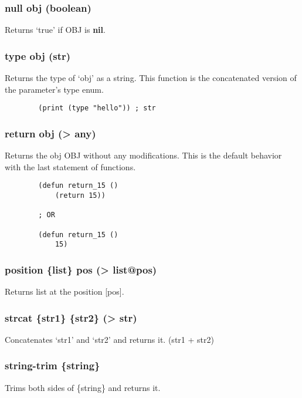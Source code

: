 \documentclass{article}
\begin{document}
	\subsubsection{null obj (boolean)}
	
	Returns `true' if OBJ is \textbf{nil}.
	
	\subsubsection{type obj (str)}
	
	Returns the type of `obj' as a string. This function is the concatenated version of the parameter's type enum.
	
	\begin{lstlisting}
		(print (type "hello")) ; str
	\end{lstlisting}

	\subsubsection{return obj (> any)}
	
	Returns the obj OBJ without any modifications. This is the default behavior with the last statement of functions.
	
	\begin{lstlisting}
		(defun return_15 ()
			(return 15))
		
		; OR
		
		(defun return_15 ()
			15)
	\end{lstlisting}
	
	\subsubsection{position \{list\}  pos (> list@pos)}

	Returns list at the position [pos].
	
	\subsubsection{strcat \{str1\} \{str2\} (> str)}
	
	Concatenates `str1' and `str2' and returns it. (str1 + str2)
	
	\subsubsection{string-trim \{string\}}

	Trims both sides of \{string\} and returns it.
	
\end{document}
